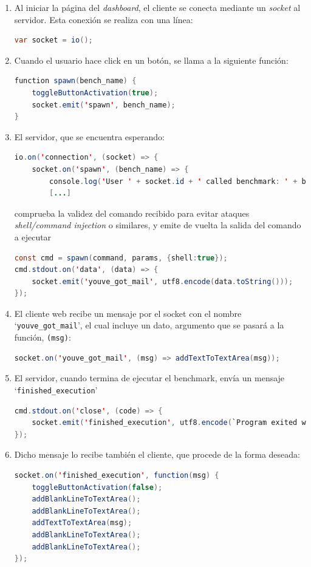 \begin{enumerate}
  \item Al iniciar la página del \textit{dashboard}, el cliente se conecta mediante un \textit{socket} al servidor. Esta conexión se realiza con una línea:
\begin{lstlisting}[language=java]
var socket = io();
\end{lstlisting}
  \item Cuando el usuario hace click en un botón, se llama a la siguiente función:
\begin{lstlisting}[language=java]
function spawn(bench_name) {
    toggleButtonActivation(true);
    socket.emit('spawn', bench_name);
}
\end{lstlisting}
  \item El servidor, que se encuentra esperando:
\begin{lstlisting}[language=java]
io.on('connection', (socket) => {
    socket.on('spawn', (bench_name) => {
        console.log('User ' + socket.id + ' called benchmark: ' + bench_name);
        [...]
\end{lstlisting}
comprueba la validez del comando recibido para evitar ataques \textit{shell/command injection} o similares, y emite de vuelta la salida del comando a ejecutar
\begin{lstlisting}[language=java]
const cmd = spawn(command, params, {shell:true});
cmd.stdout.on('data', (data) => {
    socket.emit('youve_got_mail', utf8.encode(data.toString()));
});
\end{lstlisting}
  \item El cliente web recibe un mensaje por el socket con el nombre `\texttt{youve\_got\_mail}', el cual incluye un dato, argumento que se pasará a la función, \texttt{(msg)}:
\begin{lstlisting}[language=java]
socket.on('youve_got_mail', (msg) => addTextToTextArea(msg));
\end{lstlisting}
  \item El servidor, cuando termina de ejecutar el benchmark, envía un mensaje `\texttt{finished\_execution}'
\begin{lstlisting}[language=java]
cmd.stdout.on('close', (code) => {
    socket.emit('finished_execution', utf8.encode(`Program exited with code ${Number(code)}`));
});
\end{lstlisting}
  \item Dicho mensaje lo recibe también el cliente, que procede de la forma deseada:
\begin{lstlisting}[language=java]
socket.on('finished_execution', function(msg) {
    toggleButtonActivation(false);
    addBlankLineToTextArea();
    addBlankLineToTextArea();
    addTextToTextArea(msg);
    addBlankLineToTextArea();
    addBlankLineToTextArea();
});
\end{lstlisting}
\end{enumerate}

